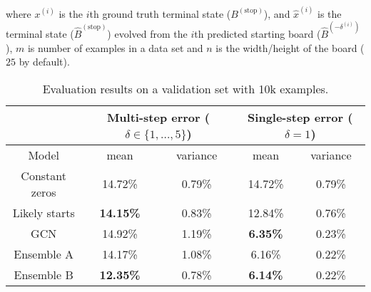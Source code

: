 \documentclass[conference]{IEEEtran}
\begin{document}

where $x^{(i)}$ is the $i$th ground truth terminal state ($B^{(\text{stop})}$), and $\hat x^{(i)}$ is the terminal state ($\hat B^{(\text{stop})}$) evolved from the $i$th predicted starting board ($\hat B^{(-\delta^{(i)})}$), $m$ is number of examples in a data set and $n$ is the width/height of the board ($25$ by default).


\iffalse
| model            |   multi-step mean |   multi-step var |   one step mean |   one step var |
|------------------+-------------------+------------------+-----------------+----------------|
| const_zeros      |          0.147179 |       0.00792056 |       0.147179  |     0.00792056 |
| mirror           |          0.172068 |       0.0127246  |       0.129641  |     0.00755696 |
| likely_starts    |          0.141522 |       0.00828948 |       0.128372  |     0.00759826 |
| gcn              |          0.149215 |       0.0119487  |       0.0634629 |     0.00229834 |
| gcn_multi        |          0.141785 |       0.0107674  |       0.0615779 |     0.0021672  |
| gcn+zeros        |          0.125545 |       0.00774776 |       0.0634882 |     0.00230135 |
| gcn+likely       |          0.124965 |       0.00788405 |       0.0633694 |     0.00231712 |
| gcn_multi+likely |          0.123533 |       0.00780647 |       0.0614331 |     0.00218183 |
\fi

\begin{table*}[t]
    \centering
    \begin{tabular}{|c|c|c|c|c|}
    \hline
     & \multicolumn{2}{|c|}{Multi-step error ($\delta \in \{1,\dots,5\}$)} & \multicolumn{2}{|c|}{Single-step error ($\delta = 1$)} \\
    \hline
    Model & mean & variance & mean & variance \\
    \hline
    Constant zeros & 14.72\% & 0.79\% & 14.72\% & 0.79\% \\
    Likely starts & \textbf{14.15\%} & 0.83\% & 12.84\% & 0.76\% \\
    GCN & 14.92\% & 1.19\% & \textbf{6.35\%} & 0.23\% \\
    \hline
    Ensemble A & 14.17\% & 1.08\% & 6.16\% & 0.22\% \\
    Ensemble B & \textbf{12.35\%} & 0.78\% & \textbf{6.14\%} & 0.22\% \\
    \hline
    \end{tabular}
    \caption{Evaluation results on a validation set with 10k examples.}
    \label{tab:eval_results}
\end{table*}
\end{document}
